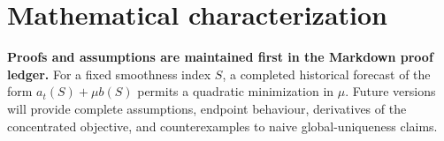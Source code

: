 \section{Mathematical characterization}
\textbf{Proofs and assumptions are maintained first in the
Markdown proof ledger.} For a fixed smoothness index $S$,
a completed historical forecast of the form $a_t(S)+\mu b(S)$
permits a quadratic minimization in $\mu$.
Future versions will provide complete assumptions, endpoint
behaviour, derivatives of the concentrated objective, and
counterexamples to naive global-uniqueness claims.

